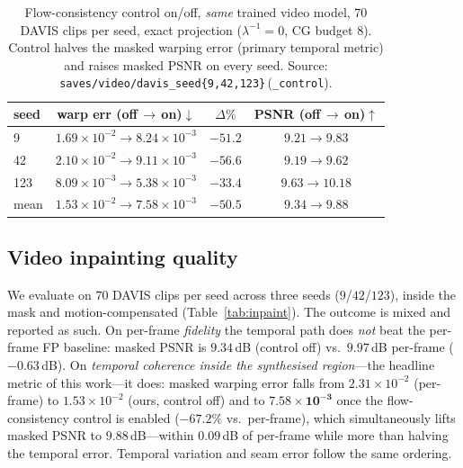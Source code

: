 \begin{table}[t]
  \centering
  \small
  \setlength{\tabcolsep}{4pt}
  \begin{tabular}{lccc}
    \toprule
    seed & warp err (off\,$\to$\,on)$\downarrow$ & $\Delta\%$ & PSNR (off\,$\to$\,on)$\uparrow$\\
    \midrule
    9    & $1.69\!\times\!10^{-2}\!\to\!8.24\!\times\!10^{-3}$ & $-51.2$ & $9.21\to9.83$\\
    42   & $2.10\!\times\!10^{-2}\!\to\!9.11\!\times\!10^{-3}$ & $-56.6$ & $9.19\to9.62$\\
    123  & $8.09\!\times\!10^{-3}\!\to\!5.38\!\times\!10^{-3}$ & $-33.4$ & $9.63\to10.18$\\
    \midrule
    mean & $1.53\!\times\!10^{-2}\!\to\!7.58\!\times\!10^{-3}$ & $\mathbf{-50.5}$ & $9.34\to9.88$\\
    \bottomrule
  \end{tabular}
  \caption{Flow-consistency control on/off, \emph{same} trained video model,
  $70$ DAVIS clips per seed, exact projection ($\lambda^{-1}{=}0$, CG budget $8$).
  Control halves the masked warping error (primary temporal metric) and raises
  masked PSNR on every seed. Source:
  \texttt{saves/video/davis\_seed\{9,42,123\}}\,(\texttt{\_control}).}
  \label{tab:control-quality}
\end{table}

\subsection{Video inpainting quality}
\label{sec:inpaint-results}
We evaluate on $70$ DAVIS clips per seed across three seeds ($9$/$42$/$123$),
inside the mask and motion-compensated (Table~\ref{tab:inpaint}). The outcome is
mixed and reported as such. On per-frame \emph{fidelity} the temporal path does
\emph{not} beat the per-frame FP baseline: masked PSNR is $9.34$\,dB (control
off) vs.\ $9.97$\,dB per-frame ($-0.63$\,dB). On \emph{temporal coherence inside
the synthesised region}---the headline metric of this work---it does: masked
warping error falls from $2.31\times10^{-2}$ (per-frame) to $1.53\times10^{-2}$
(ours, control off) and to $\mathbf{7.58\times10^{-3}}$ once the flow-consistency
control is enabled ($-67.2\%$ vs.\ per-frame), which simultaneously lifts masked
PSNR to $9.88$\,dB---within $0.09$\,dB of per-frame while more than halving the
temporal error. Temporal variation and seam error follow the same ordering.

